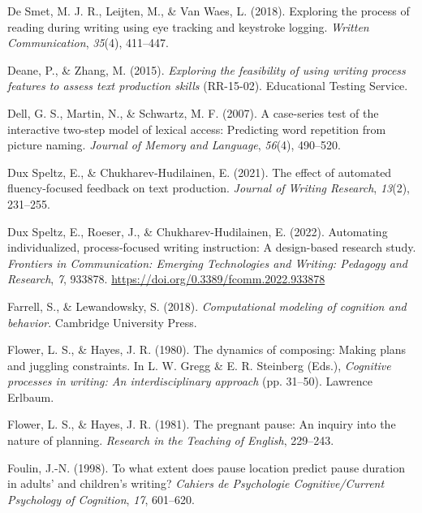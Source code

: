\documentclass[
  man,floatsintext]{apa7}
\newlength{\cslhangindent}
\newlength{\cslentryspacingunit} %
\newenvironment{CSLReferences}[2] %
 {%
  \setlength{\parindent}{0pt}
  \ifodd #1
  \let\oldpar\par
  \def\par{\hangindent=\cslhangindent\oldpar}
  \fi
  \setlength{\parskip}{#2\cslentryspacingunit}
 }%
 {}
\begin{document}
\begin{CSLReferences}{1}{0}
\leavevmode{}%
De Smet, M. J. R., Leijten, M., \& Van Waes, L. (2018). Exploring the process of reading during writing using eye tracking and keystroke logging. \emph{Written Communication}, \emph{35}(4), 411--447.

\leavevmode{}%
Deane, P., \& Zhang, M. (2015). \emph{Exploring the feasibility of using writing process features to assess text production skills} (RR-15-02). Educational Testing Service.

\leavevmode{}%
Dell, G. S., Martin, N., \& Schwartz, M. F. (2007). A case-series test of the interactive two-step model of lexical access: Predicting word repetition from picture naming. \emph{Journal of Memory and Language}, \emph{56}(4), 490--520.

\leavevmode{}%
Dux Speltz, E., \& Chukharev-Hudilainen, E. (2021). The effect of automated fluency-focused feedback on text production. \emph{Journal of Writing Research}, \emph{13}(2), 231--255.

\leavevmode{}%
Dux Speltz, E., Roeser, J., \& Chukharev-Hudilainen, E. (2022). Automating individualized, process-focused writing instruction: A design-based research study. \emph{Frontiers in Communication: Emerging Technologies and Writing: Pedagogy and Research}, \emph{7}, 933878. \url{https://doi.org/0.3389/fcomm.2022.933878}

\leavevmode{}%
Farrell, S., \& Lewandowsky, S. (2018). \emph{Computational modeling of cognition and behavior}. Cambridge University Press.

\leavevmode{}%
Flower, L. S., \& Hayes, J. R. (1980). The dynamics of composing: Making plans and juggling constraints. In L. W. Gregg \& E. R. Steinberg (Eds.), \emph{Cognitive processes in writing: An interdisciplinary approach} (pp. 31--50). Lawrence Erlbaum.

\leavevmode{}%
Flower, L. S., \& Hayes, J. R. (1981). The pregnant pause: An inquiry into the nature of planning. \emph{Research in the Teaching of English}, 229--243.

\leavevmode{}%
Foulin, J.-N. (1998). To what extent does pause location predict pause duration in adults' and children's writing? \emph{Cahiers de Psychologie Cognitive/Current Psychology of Cognition}, \emph{17}, 601--620.


\end{CSLReferences}
\end{document}
